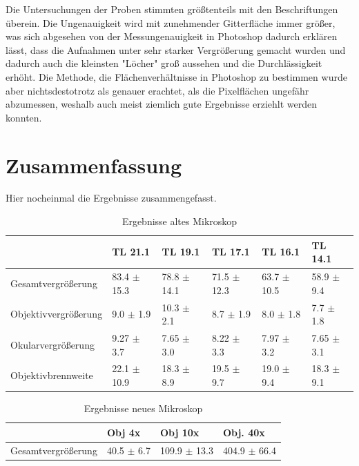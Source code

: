 \documentclass[12pt,a4paper,twoside]{article}
\begin{document}
Die Untersuchungen der Proben stimmten größtenteils mit den Beschriftungen überein. Die Ungenauigkeit wird mit zunehmender Gitterfläche immer größer, was sich abgesehen von der Messungenauigkeit in Photoshop dadurch erklären lässt, dass die Aufnahmen unter sehr starker Vergrößerung gemacht wurden und dadurch auch die kleinsten "Löcher" groß aussehen und die Durchlässigkeit erhöht.
Die Methode, die Flächenverhältnisse in Photoshop zu bestimmen wurde aber nichtsdestotrotz als genauer erachtet, als die Pixelflächen ungefähr abzumessen, weshalb auch meist ziemlich gute Ergebnisse erziehlt werden konnten. 


\section{Zusammenfassung} %

Hier nocheinmal die Ergebnisse zusammengefasst.

\begin{table}[H]
    \centering
    \caption{Ergebnisse altes Mikroskop}
    \label{tab:ErgebnisseAM}
    \begin{tabular}{| l | l | l | l | l | l |}
        \hline
         & TL 21.1 & TL 19.1 & TL 17.1 & TL 16.1 & TL 14.1 \\
        \hline
        Gesamtvergrößerung & 83.4 $\pm$ 15.3 & 78.8 $\pm$ 14.1 & 71.5 $\pm$ 12.3 & 63.7 $\pm$ 10.5 & 58.9 $\pm$ 9.4 \\
        Objektivvergrößerung & 9.0 $\pm$ 1.9 & 10.3 $\pm$ 2.1 & 8.7 $\pm$ 1.9 & 8.0 $\pm$ 1.8 & 7.7 $\pm$ 1.8 \\
        Okularvergrößerung & 9.27 $\pm$ 3.7 & 7.65 $\pm$ 3.0 & 8.22 $\pm$ 3.3 & 7.97 $\pm$ 3.2 & 7.65 $\pm$ 3.1 \\
        Objektivbrennweite & 22.1 $\pm$ 10.9 & 18.3 $\pm$ 8.9 & 19.5 $\pm$ 9.7 & 19.0 $\pm$ 9.4 & 18.3 $\pm$ 9.1 \\
        \hline
    \end{tabular}
\end{table}

\begin{table}[H]
    \centering
    \caption{Ergebnisse neues Mikroskop}
    \label{tab:ErgebnisseNM}
    \begin{tabular}{| l | l | l | l |}
        \hline
         & Obj 4x & Obj 10x & Obj. 40x \\
        \hline
        Gesamtvergrößerung & 40.5 $\pm$ 6.7 & 109.9 $\pm$ 13.3 & 404.9 $\pm$ 66.4 \\
        \hline
    \end{tabular}
\end{table}
\end{document}

